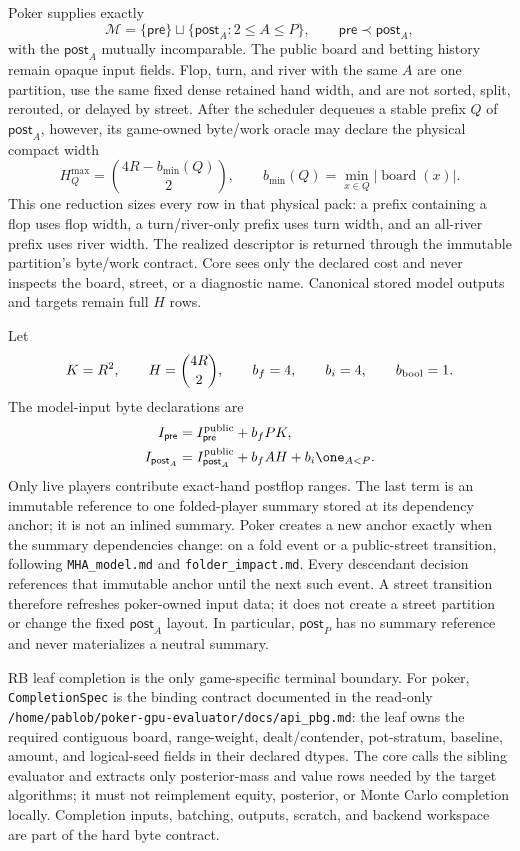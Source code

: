 \documentclass[10pt,a4paper]{article}
\newcommand{\Obj}[1]{\texttt{#1}}
\begin{document}
Poker supplies exactly
\[
  \mathcal M=\{\mathsf{pre}\}\sqcup
  \{\mathsf{post}_A:2\leq A\leq P\},
  \qquad \mathsf{pre}\prec\mathsf{post}_A,
\]
with the $\mathsf{post}_A$ mutually incomparable.  The public board and betting
history remain opaque input fields.  Flop, turn, and river with the same $A$
are one partition, use the same fixed dense retained hand width, and are not
sorted, split, rerouted, or delayed by street.  After the scheduler dequeues a
stable prefix $Q$ of $\mathsf{post}_A$, however, its game-owned byte/work oracle
may declare the physical compact width
\[
  H_Q^{\max}=\binom{4R-b_{\min}(Q)}{2},
  \qquad b_{\min}(Q)=\min_{x\in Q}|\operatorname{board}(x)|.
\]
This one reduction sizes every row in that physical pack: a prefix containing
a flop uses flop width, a turn/river-only prefix uses turn width, and an
all-river prefix uses river width.  The realized descriptor is returned through
the immutable partition's byte/work contract.  Core sees only the declared
cost and never inspects the board, street, or a diagnostic name.  Canonical
stored model outputs and targets remain full $H$ rows.

Let
\[
 K=R^2,\qquad H=\binom{4R}{2},\qquad
 b_f=4,\qquad b_i=4,\qquad b_{\rm bool}=1.
\]
The model-input byte declarations are
\begin{align*}
 I_{\mathsf{pre}}
   &=I^{\rm public}_{\mathsf{pre}}+b_fPK,\\
 I_{\mathsf{post}_A}
   &=I^{\rm public}_{\mathsf{post}_A}+b_fAH
     +b_i\one_{A<P}.
\end{align*}
Only live players contribute exact-hand postflop ranges.  The last term is an
immutable reference to one folded-player summary stored at its dependency
anchor; it is not an inlined summary.  Poker creates a new anchor exactly when
the summary dependencies change: on a fold event or a public-street
transition, following \texttt{MHA\_model.md} and
\texttt{folder\_impact.md}.  Every descendant decision references that
immutable anchor until the next such event.  A street transition therefore
refreshes poker-owned input data; it does not create a street partition or
change the fixed $\mathsf{post}_A$ layout.  In particular,
$\mathsf{post}_P$ has no summary reference and never materializes a neutral
summary.

RB leaf completion is the only game-specific terminal boundary.  For poker,
\Obj{CompletionSpec} is the binding contract documented in the read-only
\texttt{/home/pablob/poker-gpu-evaluator/docs/api\_pbg.md}: the leaf owns the
required contiguous board, range-weight, dealt/contender, pot-stratum,
baseline, amount, and logical-seed fields in their declared dtypes.  The core
calls the sibling evaluator and extracts only posterior-mass and value rows
needed by the target algorithms; it must not reimplement equity, posterior, or
Monte Carlo completion locally.  Completion inputs, batching, outputs,
scratch, and backend workspace are part of the hard byte contract.
\end{document}
